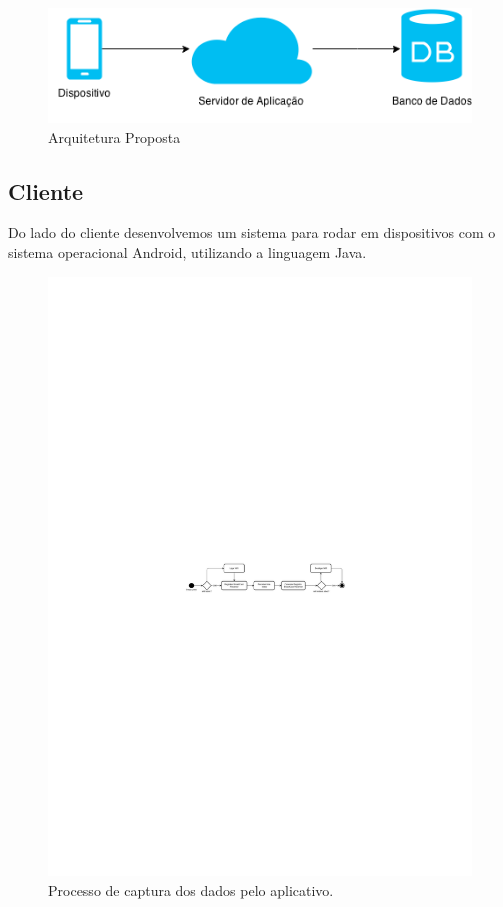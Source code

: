 \documentclass[12pt, %
openright, 
oneside,
a4paper,
brazil]{facom-ufu-abntex2}
\begin{document}
\begin{figure}[hbt]
  \includegraphics{arquiteturaProposta}
  \caption{Arquitetura Proposta}
\end{figure}


\subsection{Cliente}
Do lado do cliente desenvolvemos um sistema para rodar em dispositivos com o sistema operacional Android, utilizando a linguagem Java.

\begin{figure}[hbt]
  \includegraphics [scale=.4] {pherocast1}
  \caption{Processo de captura dos dados pelo aplicativo.}
\end{figure}
\end{document}
